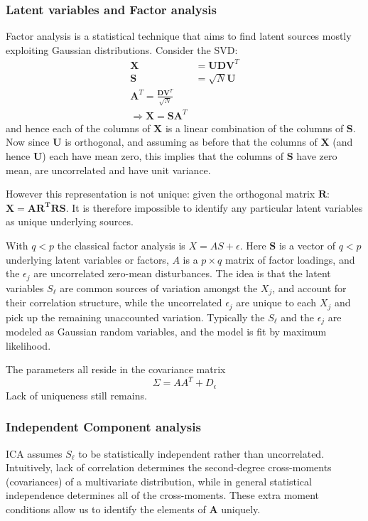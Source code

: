 \documentclass[12pt, letterpaper]{article}
\theoremstyle{definition}
\newcommand{\X}{\mathrm{\mathbf{X}}}
\begin{document}
\subsubsection{Latent variables and Factor analysis}
Factor analysis is a statistical technique that aims to find latent sources mostly exploiting Gaussian distributions.
Consider the SVD:
\begin{equation}
\begin{aligned}
\X &= \mathbf{UDV}^T\\
\mathbf{S} &= \sqrt{N}\mathbf{U}\\
\mathbf{A}^T = \frac{\mathbf{DV}^T}{\sqrt{N}}\\
\Rightarrow \X = \mathbf{SA}^T
\end{aligned}
\end{equation}
and hence each of the columns of $\X$ is a linear combination of the columns of $\mathbf{S}$. Now since $\mathbf{U}$ is orthogonal, and assuming as before that the columns of $\X$ (and hence $\mathbf{U}$) each have mean zero, this implies that the columns of $\mathbf{S}$ have zero mean, are uncorrelated and have unit variance.

However this representation is not unique: given the orthogonal matrix $\mathbf{R}$: $\X = \mathbf{AR^TRS}$.  It is therefore impossible to identify any particular latent variables as unique underlying sources.

With $q<p$ the classical factor analysis is $X = AS + \epsilon$. Here $\mathbf{S}$ is a vector of $q < p$ underlying latent variables or factors, $A$ is a $p \times q$ matrix of factor loadings, and the $\epsilon_j$ are uncorrelated zero-mean disturbances. The idea is that the latent variables $S_\ell$ are common sources of variation amongst the $X_j$, and account for their correlation structure, while the uncorrelated $\epsilon_j$ are unique to each $X_j$ and pick up the remaining unaccounted variation. Typically the $S_\ell$ and the $\epsilon_j$ are modeled as Gaussian random variables, and the model is fit by maximum likelihood.

The parameters all reside in the covariance matrix
\begin{equation}
\Sigma = AA^T +D_\epsilon
\end{equation}
Lack of uniqueness still remains.

\subsubsection{Independent Component analysis}
ICA assumes $S_\ell$ to be statistically independent rather than uncorrelated. Intuitively, lack of correlation determines the second-degree cross-moments (covariances) of a multivariate distribution, while in general statistical independence determines all of the cross-moments. These extra moment conditions allow us to identify the elements of $\mathbf{A}$ uniquely.
\end{document}
